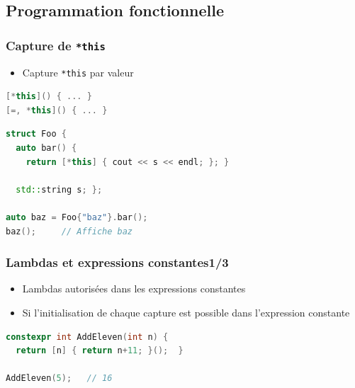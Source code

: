 \documentclass[C++.tex]{subfiles}
\begin{document}
\subsection*{Programmation fonctionnelle}
\begin{frame}[fragile]
	\frametitle{Capture de \lstinline|*this|}
	\begin{itemize}
		\item Capture \lstinline|*this| par valeur

	\end{itemize}

	\begin{lstlisting}[language=C++]
[*this]() { ... }
[=, *this]() { ... }\end{lstlisting}

	\begin{lstlisting}[language=C++]
struct Foo {
  auto bar() {
    return [*this] { cout << s << endl; }; }

  std::string s; };

auto baz = Foo{"baz"}.bar();
baz();     // Affiche baz\end{lstlisting}
\end{frame}

\begin{frame}[fragile]
	\frametitle{Lambdas et expressions constantes\titlehfill{}1/3}
	\begin{itemize}
		\item Lambdas autorisées dans les expressions constantes
		\item Si l'initialisation de chaque capture est possible dans l'expression constante
	\end{itemize}

	\begin{lstlisting}[language=C++]
constexpr int AddEleven(int n) {
  return [n] { return n+11; }();  }

AddEleven(5);   // 16\end{lstlisting}
\end{frame}
\end{document}
